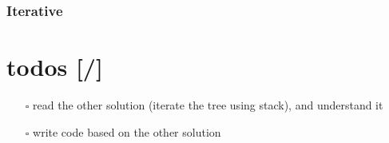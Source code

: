 \documentclass[12pt]{book}
\begin{document}
\subsubsection{Iterative}
\label{sec:org49bce97}
\section{todos [/]}
\label{sec:org1324ff7}
\begin{itemize}
\item[{$\square$}] read the other solution (iterate the tree using stack), and understand it
\item[{$\square$}] write code based on the other solution
\end{itemize}
\end{document}
